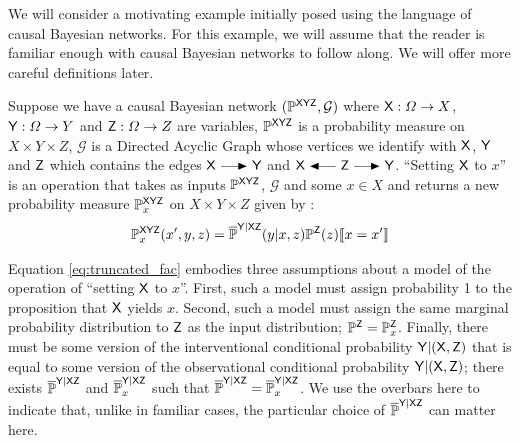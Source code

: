 We will consider a motivating example initially posed using the language of causal Bayesian networks. For this example, we will assume that the reader is familiar enough with causal Bayesian networks to follow along. We will offer more careful definitions later.

Suppose we have a causal Bayesian network $(\mathbb{P}^{\mathsf{XYZ}},\mathcal{G})$ where $\mathsf{X}:\Omega\to X$, $\mathsf{Y}:\Omega\to Y$ and $\mathsf{Z}:\Omega\to Z$ are variables, $\mathbb{P}^{\mathsf{XYZ}}$ is a probability measure on $X\times Y\times Z$, $\mathcal{G}$ is a Directed Acyclic Graph whose vertices we identify with $\mathsf{X}$, $\mathsf{Y}$ and $\mathsf{Z}$ which contains the edges $\RV{X}\longrightarrowRHD \RV{Y}$ and $\RV{X}\longleftarrowRHD \RV{Z} \longrightarrowRHD \RV{Y}$. ``Setting $\mathsf{X}$ to $x$'' is an operation that takes as inputs $\mathbb{P}^{\mathsf{XYZ}}$, $\mathcal{G}$ and some $x\in X$ and returns a new probability measure $\mathbb{P}_x^{\mathsf{XYZ}}$ on $X\times Y\times Z$ given by \citep[page ~24]{pearl_causality:_2009}:
\begin{align}
	\mathbb{P}^{\mathsf{XYZ}}_{x}(x',y,z)=\overline{\mathbb{P}}^{\mathsf{Y|XZ}}(y|x,z)\mathbb{P}^{\mathsf{Z}}(z)\llbracket x=x' \rrbracket\label{eq:truncated_fac}
\end{align}

Equation \ref{eq:truncated_fac} embodies three assumptions about a model of the operation of ``setting $\mathsf{X}$ to $x$''. First, such a model must assign probability 1 to the proposition that $\mathsf{X}$ yields $x$. Second, such a model must assign the same marginal probability distribution to $\mathsf{Z}$ as the input distribution; $\mathbb{P}^{\mathsf{Z}}=\mathbb{P}_{x}^{\mathsf{Z}}$. Finally, there must be some version of the interventional conditional probability $\mathsf{Y}|(\mathsf{X},\mathsf{Z})$ that is equal to some version of the observational conditional probability $\mathsf{Y}|(\mathsf{X},\mathsf{Z})$; there exists $\overline{\mathbb{P}}^{\mathsf{Y}|\mathsf{XZ}}$ and $\overline{\mathbb{P}}_x^{\mathsf{Y}|\mathsf{XZ}}$ such that $\overline{\mathbb{P}}^{\mathsf{Y}|\mathsf{XZ}}=\overline{\mathbb{P}}_x^{\mathsf{Y}|\mathsf{XZ}}$. We use the overbars here to indicate that, unlike in familiar cases, the particular choice of $\overline{\mathbb{P}}^{\mathsf{Y}|\mathsf{XZ}}$ can matter here.


